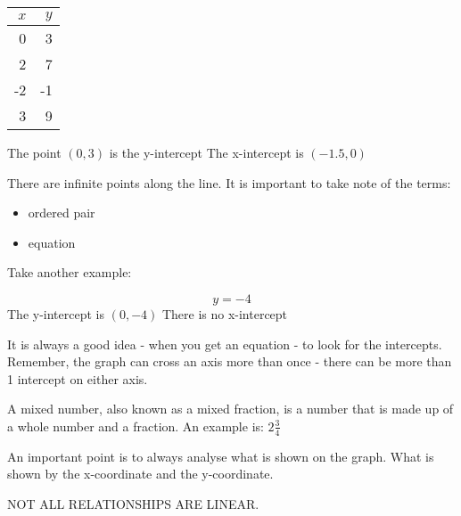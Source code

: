 \documentclass{article}
\begin{document}
\begin{tabular}{r|r}
  $x$ & $y$\\
  \hline
  0 & 3\\
  2 & 7\\
  -2 & -1\\
  3 & 9\\
\end{tabular}
  
The point $(0,3)$ is the y-intercept
The x-intercept is $(-1.5, 0)$

There are infinite points along the line.
It is important to take note of the terms:
\begin{itemize}
  \item ordered pair
  \item equation
\end{itemize}


Take another example:

$$y = -4$$
The y-intercept is $(0, -4)$
There is no x-intercept

It is always a good idea - when you get an equation - to look for the intercepts.
Remember, the graph can cross an axis more than once - there can be more than 1 intercept on either axis.

A mixed number, also known as a mixed fraction, is a number that is made up of a whole number and a fraction.
An example is:
$2 \frac{3}{4}$

An important point is to always analyse what is shown on the graph. What is shown by the x-coordinate and the y-coordinate.

NOT ALL RELATIONSHIPS ARE LINEAR.
\end{document}
